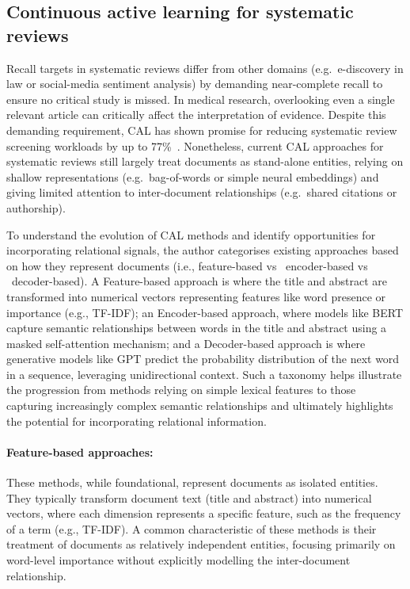 \documentclass[10pt,oneside]{book}
\begin{document}
\subsection{Continuous active learning for systematic reviews}

Recall targets in systematic reviews differ from other domains (e.g.\ e-discovery in law or social-media sentiment analysis) by demanding near-complete recall to ensure no critical study is missed. In medical research, overlooking even a single relevant article can critically affect the interpretation of evidence. Despite this demanding requirement, CAL has shown promise for reducing systematic review screening workloads by up to 77\%~\cite{van_der_vet_propagation_2016}. Nonetheless, current CAL approaches for systematic reviews still largely treat documents as stand-alone entities, relying on shallow representations (e.g.\ bag-of-words or simple neural embeddings) and giving limited attention to inter-document relationships (e.g.\ shared citations or authorship).

To understand the evolution of CAL methods and identify opportunities for incorporating relational signals, the author categorises existing approaches based on how they represent documents (i.e., feature-based vs \ encoder-based vs \ decoder-based). A Feature-based approach is where the title and abstract are transformed into numerical vectors representing features like word presence or importance (e.g., TF-IDF); an Encoder-based approach, where models like BERT capture semantic relationships between words in the title and abstract using a masked self-attention mechanism; and a Decoder-based approach is where generative models like GPT predict the probability distribution of the next word in a sequence, leveraging unidirectional context. Such a taxonomy helps illustrate the progression from methods relying on simple lexical features to those capturing increasingly complex semantic relationships and ultimately highlights the potential for incorporating relational information.

\paragraph{Feature-based approaches: }

These methods, while foundational, represent documents as isolated entities. They typically transform document text (title and abstract) into numerical vectors, where each dimension represents a specific feature, such as the frequency of a term (e.g., TF-IDF). A common characteristic of these methods is their treatment of documents as relatively independent entities, focusing primarily on word-level importance without explicitly modelling the inter-document relationship.
\end{document}
